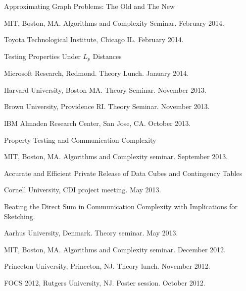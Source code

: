 \documentclass[11pt]{article}
\newenvironment{innerlist}[1][\enskip\textbullet]%
        {\begin{compactitem}[#1]}{\end{compactitem}}
\begin{document}
\begin{innerlist}
\item Approximating Graph Problems: The Old and The New
\begin{innerlist}
\item MIT, Boston, MA. Algorithms and Complexity Seminar. February 2014.
\item Toyota Technological Institute, Chicago IL. February 2014.
\end{innerlist}
\item Testing Properties Under $L_p$ Distances
\begin{innerlist}
\item Microsoft Research, Redmond. Theory Lunch. January 2014.
\item Harvard University, Boston MA. Theory Seminar. November 2013.
\item Brown University, Providence RI. Theory Seminar. November 2013.
\item IBM Almaden Research Center, San Jose, CA. October 2013.
\end{innerlist}

\item Property Testing and Communication Complexity
\begin{innerlist}
\item MIT, Boston, MA. Algorithms and Complexity seminar. September 2013.
\end{innerlist}

\item Accurate and Efficient Private Release of Data Cubes and Contingency Tables
\begin{innerlist}
\item Cornell University, CDI project meeting. May 2013.
\end{innerlist}

\item Beating the Direct Sum in Communication Complexity with Implications for Sketching.
\begin{innerlist}
\item Aarhus University, Denmark. Theory seminar. May 2013.
\item MIT, Boston, MA. Algorithms and Complexity seminar. December 2012.
\item Princeton University, Princeton, NJ. Theory lunch. November 2012.
\item FOCS 2012, Rutgers University, NJ. Poster session. October 2012.
\end{innerlist}


\end{innerlist}
\end{document}
